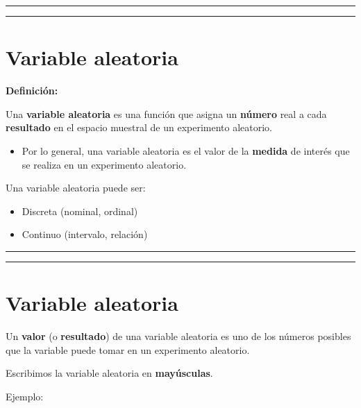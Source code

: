 \documentclass[
]{book}
\providecommand{\tightlist}{%
  \setlength{\itemsep}{0pt}\setlength{\parskip}{0pt}}
\begin{document}
\begin{center}\rule{0.5\linewidth}{0.5pt}\end{center}

\begin{center}\rule{0.5\linewidth}{0.5pt}\end{center}

\hypertarget{variable-aleatoria}{%
\section{Variable aleatoria}\label{variable-aleatoria}}

\textbf{Definición:}

Una \textbf{variable aleatoria} es una función que asigna un \textbf{número} real a cada \textbf{resultado} en el espacio muestral de un experimento aleatorio.

\begin{itemize}
\tightlist
\item
  Por lo general, una variable aleatoria es el valor de la \textbf{medida} de interés que se realiza en un experimento aleatorio.
\end{itemize}

Una variable aleatoria puede ser:

\begin{itemize}
\tightlist
\item
  Discreta (nominal, ordinal)
\item
  Continuo (intervalo, relación)
\end{itemize}

\begin{center}\rule{0.5\linewidth}{0.5pt}\end{center}

\begin{center}\rule{0.5\linewidth}{0.5pt}\end{center}

\hypertarget{variable-aleatoria-1}{%
\section{Variable aleatoria}\label{variable-aleatoria-1}}

Un \textbf{valor} (o \textbf{resultado}) de una variable aleatoria es uno de los números posibles que la variable puede tomar en un experimento aleatorio.

Escribimos la variable aleatoria en \textbf{mayúsculas}.

Ejemplo:
\end{document}
